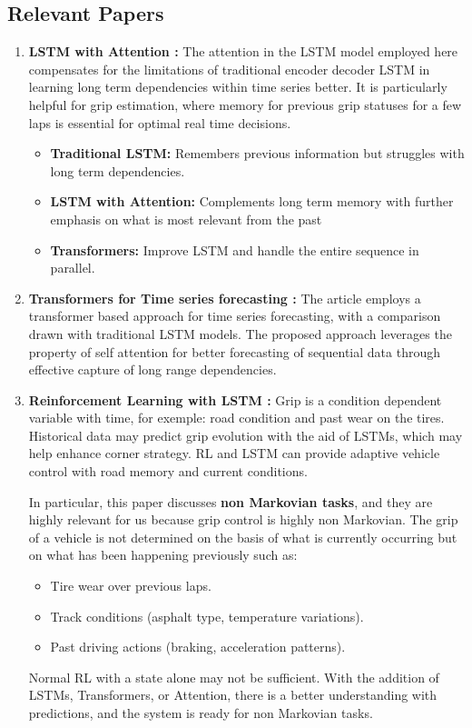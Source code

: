 \documentclass[a4paper,final,12pt]{report}
\begin{document}
\subsection{Relevant Papers}
\begin{enumerate}
    \item \textbf{LSTM with Attention \cite{Wen2023}:} The attention in the LSTM model employed here compensates for the limitations of traditional encoder decoder LSTM in learning long term dependencies within time series better. It is particularly helpful for grip estimation, where memory for previous grip statuses for a few laps is essential for optimal real time decisions.

    \begin{itemize}
        \item \textbf{Traditional LSTM:} Remembers previous information but struggles with long term dependencies.
        \item \textbf{LSTM with Attention:} Complements long term memory with further emphasis on what is most relevant from the past
        \item \textbf{Transformers:} Improve LSTM and handle the entire sequence in parallel.
    \end{itemize}

    \item \textbf{Transformers for Time series forecasting \cite{Riva2021}:}  The article employs a transformer based approach for time series forecasting, with a comparison drawn with traditional LSTM models. The proposed approach leverages the property of self attention for better forecasting of sequential data through effective capture of long range dependencies.

    \item \textbf{Reinforcement Learning with LSTM \cite{Bakker2001}:} Grip is a condition dependent variable with time, for exemple: road condition and past wear on the tires. Historical data may predict grip evolution with the aid of LSTMs, which may help enhance corner strategy. RL and LSTM can provide adaptive vehicle control with road memory and current conditions.

    In particular, this paper discusses \textbf{non Markovian tasks}, and they are highly relevant for us because grip control is highly non Markovian. The grip of a vehicle is not determined on the basis of what is currently occurring but on what has been happening previously such as:
    \begin{itemize}
        \item Tire wear over previous laps.
        \item Track conditions (asphalt type, temperature variations).
        \item Past driving actions (braking, acceleration patterns).
    \end{itemize}
    Normal RL with a state alone may not be sufficient. With the addition of LSTMs, Transformers, or Attention, there is a better understanding with predictions, and the system is ready for non Markovian tasks.
\end{enumerate}
\end{document}
